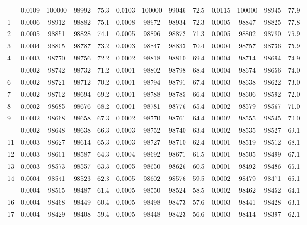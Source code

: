 \documentclass[
  14pt,
]{article}
\begin{document}
\begin{longtable}[t]{lcccccccccccc}
\endfoot
\bottomrule
\endlastfoot
0 & 0.0109 & 100000 & 98992 & 75.3 & 0.0103 & 100000 & 99046 & 72.5 & 0.0115 & 100000 & 98945 & 77.9\\
1 & 0.0006 & 98912 & 98882 & 75.1 & 0.0008 & 98972 & 98934 & 72.3 & 0.0005 & 98847 & 98825 & 77.8\\
2 & 0.0005 & 98851 & 98828 & 74.1 & 0.0005 & 98896 & 98872 & 71.3 & 0.0005 & 98802 & 98780 & 76.9\\
3 & 0.0004 & 98805 & 98787 & 73.2 & 0.0003 & 98847 & 98833 & 70.4 & 0.0004 & 98757 & 98736 & 75.9\\
4 & 0.0003 & 98770 & 98756 & 72.2 & 0.0002 & 98818 & 98810 & 69.4 & 0.0004 & 98714 & 98694 & 74.9\\
\addlinespace
5 & 0.0002 & 98742 & 98732 & 71.2 & 0.0001 & 98802 & 98798 & 68.4 & 0.0004 & 98674 & 98656 & 74.0\\
6 & 0.0002 & 98721 & 98712 & 70.2 & 0.0001 & 98794 & 98791 & 67.4 & 0.0003 & 98638 & 98622 & 73.0\\
7 & 0.0002 & 98702 & 98694 & 69.2 & 0.0001 & 98788 & 98785 & 66.4 & 0.0003 & 98606 & 98592 & 72.0\\
8 & 0.0002 & 98685 & 98676 & 68.2 & 0.0001 & 98781 & 98776 & 65.4 & 0.0002 & 98579 & 98567 & 71.0\\
9 & 0.0002 & 98668 & 98658 & 67.3 & 0.0002 & 98770 & 98761 & 64.4 & 0.0002 & 98555 & 98545 & 70.0\\
\addlinespace
10 & 0.0002 & 98648 & 98638 & 66.3 & 0.0003 & 98752 & 98740 & 63.4 & 0.0002 & 98535 & 98527 & 69.1\\
11 & 0.0003 & 98627 & 98614 & 65.3 & 0.0003 & 98727 & 98710 & 62.4 & 0.0001 & 98519 & 98512 & 68.1\\
12 & 0.0003 & 98601 & 98587 & 64.3 & 0.0004 & 98692 & 98671 & 61.5 & 0.0001 & 98505 & 98499 & 67.1\\
13 & 0.0003 & 98573 & 98557 & 63.3 & 0.0005 & 98650 & 98626 & 60.5 & 0.0001 & 98492 & 98486 & 66.1\\
14 & 0.0004 & 98541 & 98523 & 62.3 & 0.0005 & 98602 & 98576 & 59.5 & 0.0002 & 98479 & 98471 & 65.1\\
\addlinespace
15 & 0.0004 & 98505 & 98487 & 61.4 & 0.0005 & 98550 & 98524 & 58.5 & 0.0002 & 98462 & 98452 & 64.1\\
16 & 0.0004 & 98468 & 98449 & 60.4 & 0.0005 & 98498 & 98473 & 57.6 & 0.0003 & 98441 & 98428 & 63.1\\
17 & 0.0004 & 98429 & 98408 & 59.4 & 0.0005 & 98448 & 98423 & 56.6 & 0.0003 & 98414 & 98397 & 62.1\\

\end{longtable}
\end{document}

